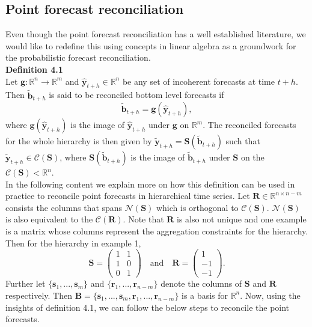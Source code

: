 \documentclass[a4paper, 11pt]{article}
\begin{document}
\subsection{Point forecast reconciliation}

Even though the point forecast reconciliation has a well established literature, we would like to redefine this using concepts in linear algebra as a groundwork for the probabilistic forecast reconciliation. \\


\noindent
\textbf{Definition 4.1}\\
\noindent
Let $\bm{g}:\bm{\mathbb{R}}^n \rightarrow \bm{\mathbb{R}}^m $ and $\hat{\bm{y}}_{t+h} \in \bm{\mathbb{R}}^n$ be any set of incoherent forecasts at time $t+h$. Then $\tilde{\bm{b}}_{t+h}$ is said to be reconciled bottom level forecasts if 
\begin{equation}
\tilde{\bm{b}}_{t+h}=\bm{g}(\hat{\bm{y}}_{t+h}),
\end{equation}
\noindent
where $\bm{g}(\hat{\bm{y}}_{t+h})$ is the image of $\hat{\bm{y}}_{t+h}$ under $\bm{g}$ on $\bm{\mathbb{R}}^m$. The reconciled forecasts for the whole hierarchy is then given by $\tilde{\bm{y}}_{t+h}=\bm{S}(\tilde{\bm{b}}_{t+h})$ such that $\tilde{\bm{y}}_{t+h} \in \mathscr{C}(\bm{S})$, where $\bm{S}(\tilde{\bm{b}}_{t+h})$ is the image of $\tilde{\bm{b}}_{t+h}$ under $\bm{S}$ on the $\mathscr{C}(\bm{S}) < \bm{\mathbb{R}}^n$.\\

\noindent
In the following content we explain more on how this definition can be used in practice to reconcile point forecasts in hierarchical time series. Let $\bm{R} \in \bm{\mathbb{R}}^{n \times n-m}$ consists the columns that spans $\mathscr{N}(\bm{S})$ which is orthogonal to $\mathscr{C}(\bm{S})$. $\mathscr{N}(\bm{S})$ is also equivalent to the $\mathscr{C}(\bm{R})$. Note that $\bm{R}$ is also not unique and one example is a matrix whose columns represent the aggregation constraints for the hierarchy. Then for the hierarchy in example 1, $$ \mathbold{S} = \begin{pmatrix} 1& 1 \\ 1 & 0 \\ 0&1 \end{pmatrix} \quad \text{and} \quad \mathbold{R} = \begin{pmatrix}  1 \\ -1 \\ -1 \end{pmatrix}.$$ 
\noindent
Further let $\{\bm{s}_1,...,\bm{s}_m\}$ and $\{\bm{r}_1,...,\bm{r}_{n-m}\}$ denote the columns of $\bm{S}$ and $\bm{R}$ respectively. Then $\bm{B}=\{\bm{s}_1,...,\bm{s}_m, \bm{r}_1,...,\bm{r}_{n-m}\}$ is a basis for $\bm{\mathbb{R}}^n$. Now, using the insights of definition 4.1, we can follow the below steps to reconcile the point forecasts.\\
\end{document}
